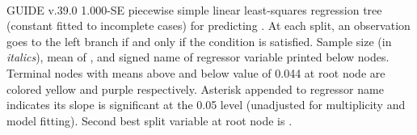 \documentclass{article}
\begin{document}
\begin{landscape}
\begin{center}
{{{{{    ~{}
   }
   }
 }
 }
 }
 \end{center}
GUIDE v.39.0 1.000-SE
piecewise simple linear least-squares regression tree
 (constant fitted to incomplete cases)
for predicting \texttt{}.
At each split, an observation goes to the left branch 
 if and only if the condition is satisfied.
Sample size (in \emph{italics}), mean of \texttt{}, and signed name of regressor variable printed below nodes.
 Terminal nodes with means above and below value of  0.044  at root node are colored yellow and purple respectively.
 Asterisk appended to regressor name indicates its slope is significant at the 0.05 level (unadjusted for multiplicity and model fitting).
 Second best split variable at root node is \texttt{}.
 \end{landscape}
 
\end{document}
